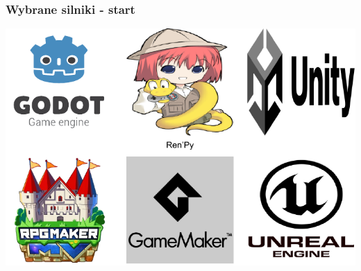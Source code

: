\documentclass{beamer}
\begin{document}
{
\begin{frame}
\end{frame}
}

\begin{frame}
  \frametitle{Wybrane silniki - start}
  \begin{center}    
  \includegraphics[width=0.8\paperwidth, height=0.8\paperheight]{usedEngines.pdf}
\end{center}
\end{frame}
\end{document}
